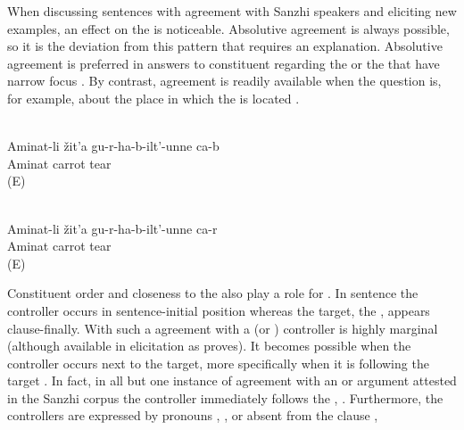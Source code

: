 When discussing sentences with  agreement with Sanzhi speakers and eliciting new examples, an effect on the  is noticeable. Absolutive agreement is always possible, so it is the deviation from this pattern that requires an explanation. Absolutive agreement is preferred in answers to constituent  regarding the  or the  that have narrow focus . By contrast,  agreement is readily available when the question is, for example, about the place in which the  is located .
%
\begin{exe}
	\ex	\label{ex:Aminat and the carrots@16}
	\begin{xlist}
		\\	\label{ex:Aminat is tearing out a carrot from under the earth@16a}
		\gll	Aminat-li	žit'a	gu-r-ha-b-ilt'-unne ca-b\\
			Aminat	carrot	tear \\
		\glt	{} (E)

		\\	\label{ex:Aminat is tearing out a carrot from under the earth@16b}
		\gll	Aminat-li	žit'a	gu-r-ha-b-ilt'-unne ca-r\\
			Aminat	carrot	tear \\
		\glt	{} (E)
	\end{xlist}
\end{exe}

Constituent order and closeness to the  also play a role for . In sentence  the controller occurs in sentence-initial position whereas the target, the , appears clause-finally. With such a  agreement with a  (or ) controller is highly marginal (although available in elicitation as  proves). It becomes possible when the controller occurs next to the target, more specifically when it is following the target . In fact, in all but one instance of agreement with an  or  argument attested in the Sanzhi corpus the controller immediately follows the  , . Furthermore, the controllers are expressed by pronouns , , or absent from the clause , 



